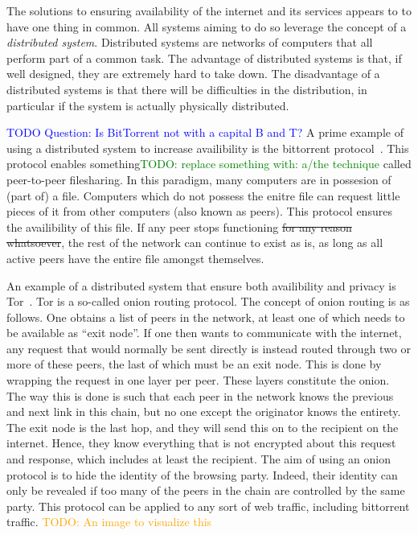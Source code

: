 \documentclass[a4paper,11pt]{book}
\newcommand\nicetohave[1]{\textcolor{orange}{TODO: #1}}
\newcommand\suggestion[1]{\textcolor{green}{TODO: #1}}
\newcommand\question[1]{\textcolor{blue}{TODO Question: #1}}
\theoremstyle{definition}
\begin{document}
The solutions to ensuring availability of the internet and its services
appears to to have one thing in common. All systems aiming to do so leverage the concept of
a \emph{distributed system}. Distributed systems are networks of computers that all perform part
of a common task. The advantage of distributed systems is that, if well designed, they are
extremely hard to take down. The disadvantage of a distributed systems is that there will
be difficulties in the distribution, in particular if the system is actually physically
distributed. 

\question{Is BitTorrent not with a capital B and T?}
A prime example of using a distributed system to increase availibility is the 
bittorrent protocol~\cite{cohen2008bittorrent}. This protocol enables something\suggestion{replace something with: a/the
technique} called peer-to-peer filesharing.
In this paradigm, many computers are in possesion of (part of) a file. Computers
which do not possess the enitre file can request little pieces of it from other
computers (also known as peers). This protocol ensures the availibility of this
file. If any peer stops functioning \sout{for any reason whatsoever}, the rest of
the network can continue to exist as is, as long as all active peers have the
entire file amongst themselves. 

An example of a distributed system that ensure both availibility and privacy is
Tor~\cite{dingledine2004tor}. Tor is a so-called onion routing protocol. 
The concept of onion routing is as follows. One obtains a list of peers in the
network, at least one of which needs to be available as ``exit node''. If one
then wants to communicate with the internet, any request that would normally
be sent directly is instead routed through two or more of these peers, the last
of which must be an exit node. This is done by wrapping the request in one
layer per peer. These layers constitute the onion. The way this is done is such
that each peer in the network knows the previous and next link in this chain,
but no one except the originator knows the entirety. The exit node is the last
hop, and they will send this on to the recipient on the internet. Hence, they
know everything that is not encrypted about this request and response, which includes at
least the recipient. 
The aim of using an onion protocol is to hide the identity of the browsing party. Indeed,
their identity can only be revealed if too many of the peers in the chain are controlled
by the same party. This protocol can be applied to any sort of web traffic, including
bittorrent traffic. 
\nicetohave{An image to visualize this}
\end{document}
